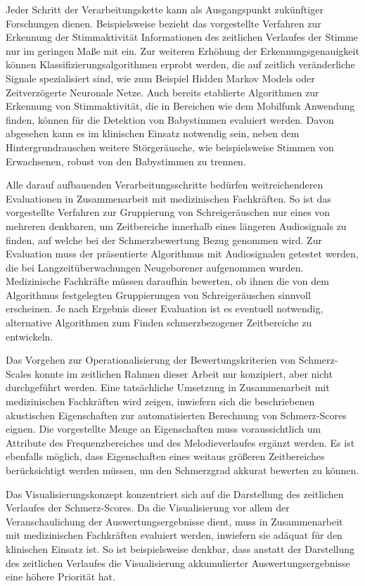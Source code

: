 Jeder Schritt der Verarbeitungskette kann als Ausgangspunkt zukünftiger Forschungen dienen. Beispielsweise bezieht das vorgestellte Verfahren zur Erkennung der Stimmaktivität Informationen des zeitlichen Verlaufes der Stimme nur im geringen Maße mit ein. Zur weiteren Erhöhung der Erkennungsgenauigkeit können Klassifizierungsalgorithmen erprobt werden, die auf zeitlich veränderliche Signale spezialisiert sind, wie zum Beispiel Hidden Markov Models oder Zeitverzögerte Neuronale Netze. Auch bereits etablierte Algorithmen zur Erkennung von Stimmaktivität, die in Bereichen wie dem Mobilfunk Anwendung finden, können für die Detektion von Babystimmen evaluiert werden. Davon abgesehen kann es im klinischen Einsatz notwendig sein, neben dem Hintergrundrauschen weitere Störgeräusche, wie beispielsweise Stimmen von Erwachsenen, robust von den Babystimmen zu trennen.

Alle darauf aufbauenden Verarbeitungsschritte bedürfen weitreichenderen Evaluationen in Zusammenarbeit mit medizinischen Fachkräften. So ist das vorgestellte Verfahren zur Gruppierung von Schreigeräuschen nur eines von mehreren denkbaren, um Zeitbereiche innerhalb eines längeren Audiosignals zu finden, auf welche bei der Schmerzbewertung Bezug genommen wird. Zur Evaluation muss der präsentierte Algorithmus mit Audiosignalen getestet werden, die bei Langzeitüberwachungen Neugeborener aufgenommen wurden. Medizinische Fachkräfte müssen daraufhin bewerten, ob ihnen die von dem Algorithmus festgelegten Gruppierungen von Schreigeräuschen sinnvoll erscheinen. Je nach Ergebnis dieser Evaluation ist es eventuell notwendig, alternative Algorithmen zum Finden schmerzbezogener Zeitbereiche zu entwickeln.

Das Vorgehen zur Operationalisierung der Bewertungskriterien von Schmerz-Scales konnte im zeitlichen Rahmen dieser Arbeit nur konzipiert, aber nicht durchgeführt werden. Eine tatsächliche Umsetzung in Zusammenarbeit mit medizinischen Fachkräften wird zeigen, inwiefern sich die beschriebenen akustischen Eigenschaften zur automatisierten Berechnung von Schmerz-Scores eignen. Die vorgestellte Menge an Eigenschaften muss voraussichtlich um Attribute des Frequenzbereiches und des Melodieverlaufes ergänzt werden. Es ist ebenfalls möglich, dass Eigenschaften eines weitaus größeren Zeitbereiches berücksichtigt werden müssen, um den Schmerzgrad akkurat bewerten zu können.

Das Visualisierungskonzept konzentriert sich auf die Darstellung des zeitlichen Verlaufes der Schmerz-Scores. Da die Visualisierung vor allem der Veranschaulichung der Auswertungsergebnisse dient, muss in Zusammenarbeit mit medizinischen Fachkräften evaluiert werden, inwiefern sie adäquat für den klinischen Einsatz ist. So ist beispielsweise denkbar, dass anstatt der Darstellung des zeitlichen Verlaufes die Visualisierung akkumulierter Auswertungsergebnisse eine höhere Priorität hat.

